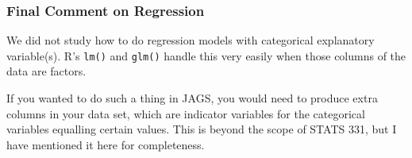 \documentclass{beamer}
\begin{document}
\begin{frame}[fragile]
\frametitle{Final Comment on Regression}
We did not study how to do regression models with categorical explanatory
variable(s). R's \texttt{lm()} and \texttt{glm()} handle this
very easily when those columns of the data are factors.\\[0.5em]\pause

If you wanted to do such a thing in JAGS, you would need to produce extra
columns in your data set, which are indicator variables for the categorical
variables equalling certain values. This is beyond the scope of STATS 331,
but I have mentioned it here for completeness.


\end{frame}
\end{document}
